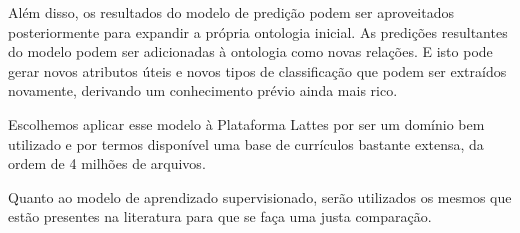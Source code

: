 Além disso, os resultados do modelo de predição podem ser aproveitados posteriormente para expandir a própria ontologia inicial. As predições resultantes do modelo podem ser adicionadas à ontologia como novas relações. E isto pode gerar novos atributos úteis e novos tipos de classificação que podem ser extraídos novamente, derivando um conhecimento prévio ainda mais rico.

Escolhemos aplicar esse modelo à Plataforma Lattes por ser um domínio bem utilizado e por termos disponível uma base de currículos bastante extensa, da ordem de 4 milhões de arquivos.

Quanto ao modelo de aprendizado supervisionado, serão utilizados os mesmos que estão presentes na literatura para que se faça uma justa comparação.
